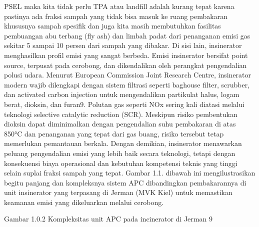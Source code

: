 \documentclass[
  letterpaper,
  DIV=11,
  numbers=noendperiod]{scrreprt}
\begin{document}
PSEL maka kita tidak perlu TPA atau landfill adalah kurang tepat karena
pastinya ada fraksi sampah yang tidak bisa masuk ke ruang pembakaran
khususnya sampah spesifik dan juga kita masih membutuhkan fasilitas
pembuangan abu terbang (fly ash) dan limbah padat dari penanganan emisi
gas sekitar 5 sampai 10 persen dari sampah yang dibakar. Di sisi lain,
insinerator menghasilkan profil emisi yang sangat berbeda. Emisi
insinerator bersifat point source, terpusat pada cerobong, dan
dikendalikan oleh perangkat pengendalian polusi udara. Menurut European
Commission Joint Research Centre, insinerator modern wajib dilengkapi
dengan sistem filtrasi seperti baghouse filter, scrubber, dan activated
carbon injection untuk mengendalikan partikulat halus, logam berat,
dioksin, dan furan9. Polutan gas seperti NOx sering kali diatasi melalui
teknologi selective catalytic reduction (SCR). Meskipun risiko
pembentukan dioksin dapat diminimalkan dengan pengendalian suhu
pembakaran di atas 850°C dan penanganan yang tepat dari gas buang,
risiko tersebut tetap memerlukan pemantauan berkala. Dengan demikian,
insinerator menawarkan peluang pengendalian emisi yang lebih baik secara
teknologi, tetapi dengan konsekuensi biaya operasional dan kebutuhan
kompetensi teknis yang tinggi selain suplai fraksi sampah yang tepat.
Gambar 1.1. dibawah ini mengilustrasikan begitu panjang dan kompleksnya
sistem APC dibandingkan pembakarannya di unit insinerator yang terpasang
di Jerman (MVK Kiel) untuk memastikan keamanan emisi yang dikeluarkan
melalui cerobong.

Gambar 1.0.2 Kompleksitas unit APC pada incinerator di Jerman 9
\end{document}
